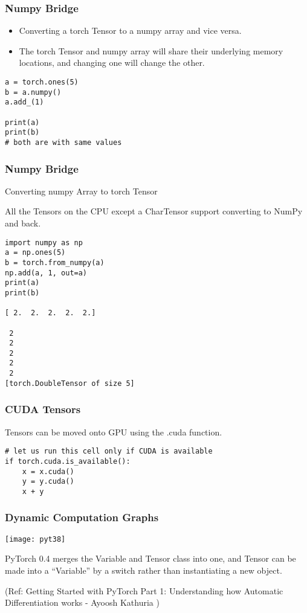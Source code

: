 \begin{frame}[fragile] \frametitle{Numpy Bridge}
\begin{itemize}
\item Converting a torch Tensor to a numpy array and vice versa. 
\item The torch Tensor and numpy array will share their underlying memory locations, and changing one will change the other.
\end{itemize}

\begin{lstlisting}
a = torch.ones(5)
b = a.numpy()
a.add_(1)

print(a)
print(b)
# both are with same values
\end{lstlisting}
\end{frame}

\begin{frame}[fragile] \frametitle{Numpy Bridge}
Converting numpy Array to torch Tensor

All the Tensors on the CPU except a CharTensor support converting to NumPy and back.

\begin{lstlisting}
import numpy as np
a = np.ones(5)
b = torch.from_numpy(a)
np.add(a, 1, out=a)
print(a)
print(b)

[ 2.  2.  2.  2.  2.]

 2
 2
 2
 2
 2
[torch.DoubleTensor of size 5]
\end{lstlisting}
\end{frame}

\begin{frame}[fragile] \frametitle{CUDA Tensors}
Tensors can be moved onto GPU using the .cuda function.

\begin{lstlisting}
# let us run this cell only if CUDA is available
if torch.cuda.is_available():
    x = x.cuda()
    y = y.cuda()
    x + y

\end{lstlisting}
\end{frame}

\begin{frame}[fragile] \frametitle{Dynamic Computation Graphs}

\begin{center}
\texttt{[image: pyt38]}
\end{center}
PyTorch 0.4 merges the Variable and Tensor class into one, and Tensor can be made into a “Variable” by a switch rather than instantiating a new object. 

{\tiny (Ref: Getting Started with PyTorch Part 1: Understanding how Automatic Differentiation works - Ayoosh Kathuria )}
\end{frame}



